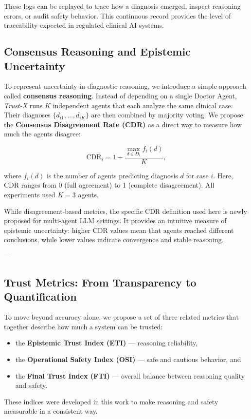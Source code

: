 \documentclass[letterpaper]{article} %
\begin{document}
These logs can be replayed to trace how a diagnosis emerged, inspect reasoning errors, or audit safety behavior.  
This continuous record provides the level of traceability expected in regulated clinical AI systems.

\subsection{Consensus Reasoning and Epistemic Uncertainty}

To represent uncertainty in diagnostic reasoning, we introduce a simple approach called \textbf{consensus reasoning}.  
Instead of depending on a single Doctor Agent, \textit{Trust-X} runs $K$ independent agents that each analyze the same clinical case.  
Their diagnoses $\{d_{i1}, \dots, d_{iK}\}$ are then combined by majority voting.  
We propose the \textbf{Consensus Disagreement Rate (CDR)} as a direct way to measure how much the agents disagree:

\[
\mathrm{CDR}_i = 1 - \frac{\max_{d \in D_i} f_i(d)}{K},
\]

where $f_i(d)$ is the number of agents predicting diagnosis $d$ for case $i$.  
Here, CDR ranges from 0 (full agreement) to 1 (complete disagreement).  
All experiments used $K=3$ agents.

While disagreement-based metrics, the specific CDR definition used here is newly proposed for multi-agent LLM settings.  
It provides an intuitive measure of epistemic uncertainty: higher CDR values mean that agents reached different conclusions, while lower values indicate convergence and stable reasoning.  

---

\subsection{Trust Metrics: From Transparency to Quantification}

To move beyond accuracy alone, we propose a set of three related metrics that together describe how much a system can be trusted:
\begin{itemize}
    \item the \textbf{Epistemic Trust Index (ETI)} — reasoning reliability,
    \item the \textbf{Operational Safety Index (OSI)} — safe and cautious behavior, and
    \item the \textbf{Final Trust Index (FTI)} — overall balance between reasoning quality and safety.
\end{itemize}
These indices were developed in this work to make reasoning and safety measurable in a consistent way.
\end{document}
